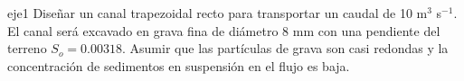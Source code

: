 \documentclass[11pt, oneside]{article}
\begin{document}
\begin{eje}{}{eje1}
Diseñar un canal trapezoidal recto para transportar un caudal de 10 m$^3$ s$^{-1}$. El canal ser\'a excavado en grava fina de di\'ametro 8 mm  con una pendiente del terreno $S_o = 0.00318$. Asumir que las part\'iculas de grava son casi redondas y la concentraci\'on de sedimentos en suspensi\'on en el flujo es baja. 
\end{eje}


\end{document}
